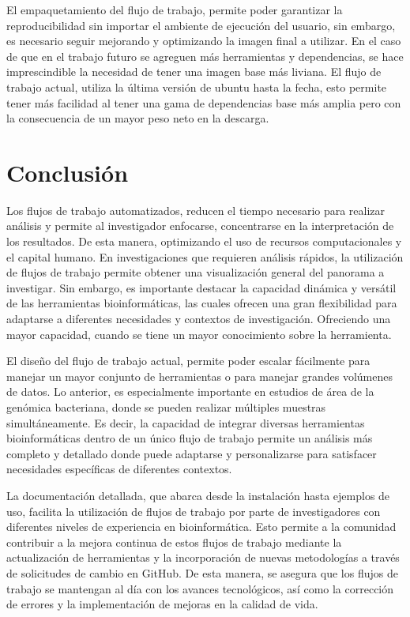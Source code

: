 \documentclass[12pt]{article}
\begin{document}
El empaquetamiento del flujo de trabajo, permite poder garantizar la reproducibilidad sin importar el ambiente de ejecución del usuario, sin embargo, es necesario seguir mejorando y optimizando la imagen final a utilizar. En el caso de que en el trabajo futuro se agreguen más herramientas y dependencias, se hace imprescindible la necesidad de tener una imagen base más liviana. El flujo de trabajo actual, utiliza la última versión de ubuntu hasta la fecha, esto permite tener más facilidad al tener una gama de dependencias base más amplia pero con la consecuencia de un mayor peso neto en la descarga. 



\newpage
\section{Conclusión}
Los flujos de trabajo automatizados, reducen el tiempo necesario para realizar análisis y permite al investigador enfocarse, concentrarse en la interpretación de los resultados. De esta manera, optimizando el uso de recursos computacionales y el capital humano. En investigaciones que requieren análisis rápidos, la utilización de flujos de trabajo permite obtener una visualización general del panorama a investigar. Sin embargo, es importante destacar la capacidad dinámica y versátil de las herramientas bioinformáticas, las cuales ofrecen una gran flexibilidad para adaptarse a diferentes necesidades y contextos de investigación. Ofreciendo una mayor capacidad, cuando se tiene un mayor conocimiento sobre la herramienta.


El diseño del flujo de trabajo actual, permite poder escalar fácilmente para manejar un mayor conjunto de herramientas o para manejar grandes volúmenes de datos. Lo anterior, es especialmente importante en estudios de área de la genómica bacteriana, donde se pueden realizar múltiples muestras simultáneamente. Es decir, la capacidad de integrar diversas herramientas bioinformáticas dentro de un único flujo de trabajo permite un análisis más completo y detallado donde puede adaptarse y personalizarse para satisfacer necesidades específicas de diferentes contextos. 


La documentación detallada, que abarca desde la instalación hasta ejemplos de uso, facilita la utilización de flujos de trabajo por parte de investigadores con diferentes niveles de experiencia en bioinformática. Esto permite a la comunidad contribuir a la mejora continua de estos flujos de trabajo mediante la actualización de herramientas y la incorporación de nuevas metodologías a través de solicitudes de cambio en GitHub. De esta manera, se asegura que los flujos de trabajo se mantengan al día con los avances tecnológicos, así como la corrección de errores y la implementación de mejoras en la calidad de vida.
\end{document}
